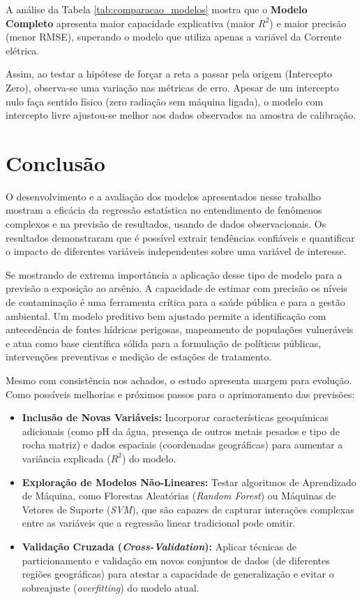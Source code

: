 \documentclass{article}
\begin{document}
A análise da Tabela \ref{tab:comparacao_modelos} mostra que o \textbf{Modelo Completo} apresenta maior capacidade explicativa (maior $R^2$) e maior precisão (menor RMSE), superando o modelo que utiliza apenas a variável da Corrente elétrica. 

Assim, ao testar a hipótese de forçar a reta a passar pela origem (Intercepto Zero), observa-se uma variação nas métricas de erro. Apesar de um intercepto nulo faça sentido físico (zero radiação sem máquina ligada), o modelo com intercepto livre ajustou-se melhor aos dados observados na amostra de calibração.

\section{Conclusão}

O desenvolvimento e a avaliação dos modelos apresentados nesse trabalho mostram a eficácia da regressão estatística no entendimento de fenômenos complexos e na previsão de resultados, usando de dados observacionais. Os resultados demonstraram que é possível extrair tendências confiáveis e quantificar o impacto de diferentes variáveis independentes sobre uma variável de interesse.

Se mostrando de extrema importância a aplicação desse tipo de modelo para a previsão a exposição ao arsênio. A capacidade de estimar com precisão os níveis de contaminação é uma ferramenta crítica para a saúde pública e para a gestão ambiental. Um modelo preditivo bem ajustado permite a identificação com antecedência de fontes hídricas perigosas, mapeamento de populações vulneráveis e atua como base científica sólida para a formulação de políticas públicas, intervenções preventivas e medição de estações de tratamento.

Mesmo com consistência nos achados, o estudo apresenta margem para evolução. Como possíveis melhorias e próximos passos para o aprimoramento das previsões:

\begin{itemize}
    \item \textbf{Inclusão de Novas Variáveis:} Incorporar características geoquímicas adicionais (como pH da água, presença de outros metais pesados e tipo de rocha matriz) e dados espaciais (coordenadas geográficas) para aumentar a variância explicada ($R^2$) do modelo.
    \item \textbf{Exploração de Modelos Não-Lineares:} Testar algoritmos de Aprendizado de Máquina, como Florestas Aleatórias (\textit{Random Forest}) ou Máquinas de Vetores de Suporte (\textit{SVM}), que são capazes de capturar interações complexas entre as variáveis que a regressão linear tradicional pode omitir.
    \item \textbf{Validação Cruzada (\textit{Cross-Validation}):} Aplicar técnicas de particionamento e validação em novos conjuntos de dados (de diferentes regiões geográficas) para atestar a capacidade de generalização e evitar o sobreajuste (\textit{overfitting}) do modelo atual.
\end{itemize}
\end{document}
